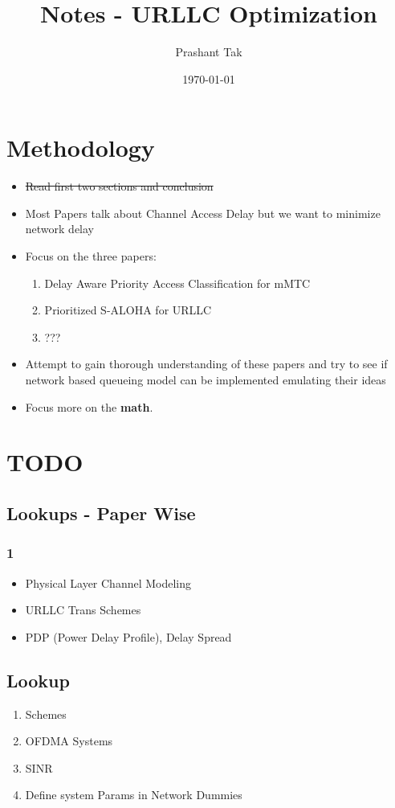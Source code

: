 \documentclass[11pt]{article}
\author{Prashant Tak}
\date{\today}
\title{Notes - URLLC Optimization}
\begin{document}
\maketitle
\setcounter{tocdepth}{2}
\tableofcontents \clearpage
\section{Methodology}
\label{sec:orga65714f}
\begin{itemize}
\item \sout{Read first two sections and conclusion}
\item Most Papers talk about Channel Access Delay but we want to minimize network delay
\item Focus on the three papers:
\begin{enumerate}
\item Delay Aware Priority Access Classification for mMTC
\item Prioritized S-ALOHA for URLLC
\item ???
\end{enumerate}
\item Attempt to gain thorough understanding of these papers and try to see if network based queueing model can be implemented emulating their ideas
\item Focus more on the \textbf{math}.
\end{itemize}
\section{TODO}
\label{sec:orga86ec40}
\subsection{Lookups - Paper Wise}
\label{sec:org808428a}
\subsubsection{1}
\label{sec:org30bb111}
\begin{itemize}
\item Physical Layer Channel Modeling
\item URLLC Trans Schemes
\item PDP (Power Delay Profile), Delay Spread
\end{itemize}
\subsection{Lookup}
\label{sec:orgbb487b8}
\begin{enumerate}
\item Schemes
\item OFDMA Systems
\item SINR
\item Define system Params in Network Dummies
\end{enumerate}
\end{document}
